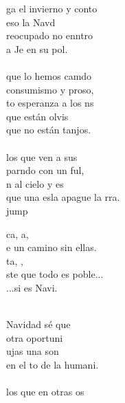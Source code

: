 \begin{cancion}%
	ga el invierno y conto \\
	eso la Navd\\
	reocupado no enntro \\
	a Je en su pol. \\
	\jump\\
	que lo hemos camdo \\
	 consumismo  y proso,\\
	to esperanza a los ns\\
	que están olvis\\
	que no están tanjos. \\
	\jump\\
	los que ven a sus \\
	parndo con un ful,\\
	n al cielo y es \\
	que una esla apague la rra.\\jump\\
	\begin{chorus}%
	ca, a, \\
	e un camino sin ellas. \\
	ta, , \\
	ste que todo es poble...\\
	...si es Navi. \\
	\end{chorus}%
	\jump\\
	Navidad sé que \\
	 otra oportuni\\
	ujas una son\\
	en el to de la humani.\\
	\jump\\
	los que en otras os\\

\end{cancion}
